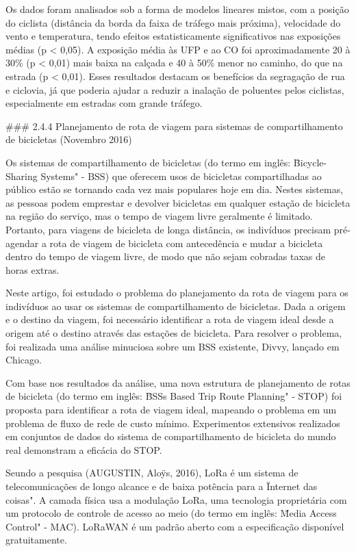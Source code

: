 Os dados foram analisados sob a forma de modelos lineares mistos, com a posição do ciclista 
(distância da borda da faixa de tráfego mais próxima), velocidade do vento e temperatura, tendo 
efeitos estatisticamente significativos nas exposições médias (p < 0,05). A exposição média às UFP e 
ao CO foi aproximadamente 20 à 30\% (p < 0,01) mais baixa na calçada e 40 à 50\% menor no caminho, 
do que na estrada (p < 0,01). Esses resultados destacam os benefícios da segragação de rua e 
ciclovia, já que poderia ajudar a reduzir a inalação de poluentes pelos ciclistas, especialmente em 
estradas com grande tráfego.

### 2.4.4 Planejamento de rota de viagem para sistemas de compartilhamento de bicicletas (Novembro 
2016) 

Os sistemas de compartilhamento de bicicletas (do termo em inglês: \"Bicycle-Sharing Systems" - BSS) 
que oferecem usos de bicicletas compartilhadas ao público estão se tornando cada vez mais populares 
hoje em dia. Nestes sistemas, as pessoas podem emprestar e devolver bicicletas em qualquer estação 
de bicicleta na região do serviço, mas o tempo de viagem livre geralmente é limitado. Portanto, para 
viagens de bicicleta de longa distância, os indivíduos precisam pré-agendar a rota de viagem de 
bicicleta com antecedência e mudar a bicicleta dentro do tempo de viagem livre, de modo que não sejam 
cobradas taxas de horas extras. 

Neste artigo, foi estudado o problema do planejamento da rota de viagem para os indivíduos ao usar os 
sistemas de compartilhamento de bicicletas. Dada a origem e o destino da viagem, foi necessário 
identificar a rota de viagem ideal desde a origem até o destino através das estações de bicicleta. 
Para resolver o problema, foi realizada uma análise minuciosa sobre um BSS existente, Divvy, lançado 
em Chicago. 

Com base nos resultados da análise, uma nova estrutura de planejamento de rotas de bicicleta (do 
termo em inglês: \"BSSs Based Trip Route Planning" - STOP) foi proposta para identificar a rota de 
viagem ideal, mapeando o problema em um problema de fluxo de rede de custo mínimo. Experimentos 
extensivos realizados em conjuntos de dados do sistema de compartilhamento de bicicleta do mundo 
real demonstram a eficácia do STOP.

Seundo a pesquisa (AUGUSTIN, Aloÿs, 2016), LoRa é um sistema de telecomunicações de longo alcance e 
de baixa potência para a \"Internet das coisas". A camada física usa a modulação LoRa, uma tecnologia 
proprietária com um protocolo de controle de acesso ao meio (do termo em inglês: \"Media Access 
Control" - MAC). LoRaWAN é um padrão aberto com a especificação disponível gratuitamente.


